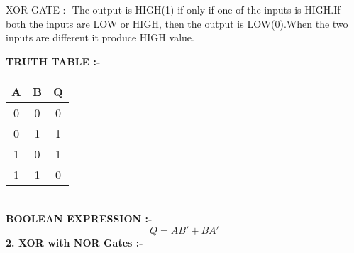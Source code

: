 \documentclass[10pt, a4paper]{article}
\begin{document}
{XOR GATE :-}
The output is HIGH(1) if only if one of the inputs is HIGH.If both the inputs are LOW or HIGH, then the output is LOW(0).When the two inputs are different it produce HIGH value.
\vspace{5MM}

\textbf{TRUTH TABLE :-}
\vspace{5MM}
\newline

\begin{tabular}{|c|c|c|}
\hline
\textbf{A} & {B} & {Q} \\
\hline
0 & 0 & 0 \\
\hline
0 & 1 & 1 \\
\hline
1 & 0 & 1 \\
\hline
1 & 1 & 0 \\
\hline


\end{tabular}
\vspace{3mm}
\\

\textbf{BOOLEAN EXPRESSION :-}
\vspace{5MM}
\newline
\begin{equation}
    Q = AB' + BA'
\end{equation}
\textbf{2. XOR with NOR Gates :-}
\end{document}
